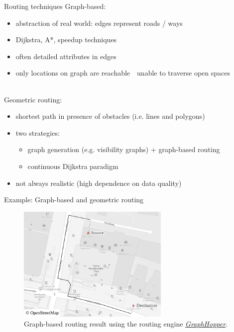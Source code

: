 \documentclass[xcolor={x11names}]{beamer}
\renewcommand{\n}{\hfill\\[0.5ex]}
\newenvironment{figcenter}
{%
	\parskip=0pt%
	\par%
	\nopagebreak%
	\centering%
}%
{%
	\par%
	\noindent%
	\ignorespacesafterend%
}
\begin{document}
		\begin{frame}{Routing techniques}
			Graph-based:\n
			\begin{itemize}
				\item abstraction of real world: edges represent roads / ways
				\item Dijkstra, A*, speedup techniques
				\item often detailed attributes in edges
				\pause
				\item only locations on graph are reachable\ \textrightarrow\ unable to traverse open spaces
			\end{itemize}
			\n
			\pause
			Geometric routing:\n
			\begin{itemize}
				\item shortest path in presence of obstacles (i.e. lines and polygons)
				\item two strategies:
				\begin{itemize}
					\item graph generation (e.g. visibility graphs) + graph-based routing
					\item continuous Dijkstra paradigm
				\end{itemize}
				\pause
				\item not always realistic (high dependence on data quality)
			\end{itemize}
		\end{frame}
	
		\begin{frame}{Example: Graph-based and geometric routing}
			\begin{figure}[t]
				\begin{figcenter}
					\includegraphics[width=0.65\textwidth]{images/qgis-routing-osterstrasse_routing.pdf}
				\end{figcenter}
				\caption{Graph-based routing result using the routing engine \href{https://www.osm.org/directions?engine=graphhopper\_foot\&route=53.57657,9.95210;53.57601,9.95268}{\emph{GraphHopper}}.}
			\end{figure}
		\end{frame}
	
\end{document}
